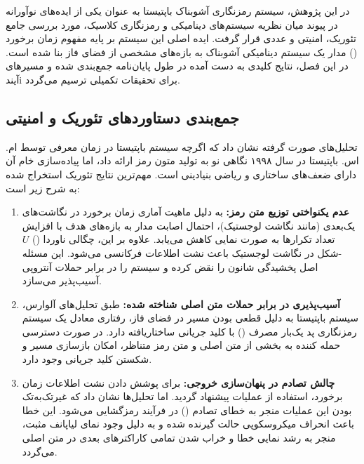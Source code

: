 \documentclass[12pt]{report}
\begin{document}
در این پژوهش، سیستم رمزنگاری آشوبناک باپتیستا به عنوان یکی از ایده‌های نوآورانه در پیوند میان نظریه 
سیستم‌های دینامیکی و رمزنگاری کلاسیک، مورد بررسی جامع تئوریک، امنیتی و عددی قرار گرفت. ایده اصلی این 
سیستم بر پایه مفهوم زمان برخورد () مدار یک سیستم دینامیکی آشوبناک به بازه‌های مشخصی از 
فضای فاز بنا شده است. در این فصل، نتایج کلیدی به دست آمده در طول پایان‌نامه جمع‌بندی شده و مسیرهای آیندi 
برای تحقیقات تکمیلی ترسیم می‌گردد.

\subsection{جمع‌بندی دستاوردهای تئوریک و امنیتی}
تحلیل‌های صورت گرفته نشان داد که اگرچه سیستم باپتیستا در زمان معرفی توسط ام. اس. باپتیستا در سال ۱۹۹۸ 
نگاهی نو به تولید متون رمز ارائه داد، اما پیاده‌سازی خام آن دارای ضعف‌های ساختاری و ریاضی بنیادینی است. 
مهم‌ترین نتایج تئوریک استخراج شده به شرح زیر است:

\begin{enumerate}
    \item \textbf{عدم یکنواختی توزیع متن رمز:} به دلیل ماهیت آماری زمان برخورد در نگاشت‌های یک‌بعدی (مانند 
    نگاشت لوجستیک)، احتمال اصابت مدار به بازه‌های هدف با افزایش تعداد تکرارها به صورت نمایی کاهش می‌یابد. 
    علاوه بر این، چگالی ناوردا () $U$-شکل در نگاشت لوجستیک باعث نشت اطلاعات فرکانسی 
    می‌شود. این مسئله اصل پخشیدگی شانون را نقض کرده و سیستم را در برابر حملات آنتروپی آسیب‌پذیر می‌سازد.
    
    \item \textbf{آسیب‌پذیری در برابر حملات متن اصلی شناخته شده:} طبق تحلیل‌های آلوارس، سیستم باپتیستا به دلیل 
    قطعی بودن مسیر در فضای فاز، رفتاری معادل یک سیستم رمزنگاری پد یک‌بار مصرف () با کلید 
    جریانی ساختاریافته دارد. در صورت دسترسی حمله کننده به بخشی از متن اصلی و متن رمز متناظر، امکان بازسازی 
    مسیر و شکستن کلید جریانی وجود دارد.
    
    \item \textbf{چالش تصادم در پنهان‌سازی خروجی:} برای پوشش دادن نشت اطلاعات زمان برخورد، استفاده از عملیات 
     پیشنهاد گردید. اما تحلیل‌ها نشان داد که غیرتک‌به‌تک بودن این عملیات منجر به خطای تصادم 
    () در فرآیند رمزگشایی می‌شود. این خطا باعث انحراف میکروسکوپی حالت گیرنده شده و به دلیل 
    وجود نمای لیاپانف مثبت، منجر به رشد نمایی خطا و خراب شدن تمامی کاراکترهای بعدی در متن اصلی می‌گردد.
\end{enumerate}
\end{document}
